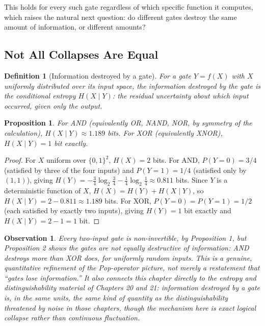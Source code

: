 \documentclass[12pt]{article}
\newtheorem{definition}{Definition}
\newtheorem{proposition}{Proposition}
\newtheorem{observation}{Observation}
\begin{document}
This holds for every such gate regardless of which specific function it computes, which raises the natural next question: do different gates destroy the same amount of information, or different amounts?

\subsection{Not All Collapses Are Equal}

\begin{definition}[Information destroyed by a gate]
For a gate $Y = f(X)$ with $X$ uniformly distributed over its input space, the information destroyed by the gate is the conditional entropy $H(X \mid Y)$: the residual uncertainty about which input occurred, given only the output.
\end{definition}

\begin{proposition}
For AND (equivalently OR, NAND, NOR, by symmetry of the calculation), $H(X\mid Y) \approx 1.189$ bits. For XOR (equivalently XNOR), $H(X\mid Y) = 1$ bit exactly.
\end{proposition}

\begin{proof}
For $X$ uniform over $\{0,1\}^2$, $H(X) = 2$ bits. For AND, $P(Y=0) = 3/4$ (satisfied by three of the four inputs) and $P(Y=1)=1/4$ (satisfied only by $(1,1)$), giving $H(Y) = -\tfrac{3}{4}\log_2\tfrac{3}{4} - \tfrac{1}{4}\log_2\tfrac{1}{4} \approx 0.811$ bits. Since $Y$ is a deterministic function of $X$, $H(X) = H(Y) + H(X\mid Y)$, so $H(X\mid Y) = 2 - 0.811 \approx 1.189$ bits. For XOR, $P(Y=0)=P(Y=1)=1/2$ (each satisfied by exactly two inputs), giving $H(Y)=1$ bit exactly and $H(X\mid Y) = 2 - 1 = 1$ bit.
\end{proof}

\begin{observation}
Every two-input gate is non-invertible, by Proposition 1, but Proposition 2 shows the gates are not equally destructive of information: AND destroys more than XOR does, for uniformly random inputs. This is a genuine, quantitative refinement of the Pop-operator picture, not merely a restatement that ``gates lose information.'' It also connects this chapter directly to the entropy and distinguishability material of Chapters 20 and 21: information destroyed by a gate is, in the same units, the same kind of quantity as the distinguishability threatened by noise in those chapters, though the mechanism here is exact logical collapse rather than continuous fluctuation.
\end{observation}
\end{document}
